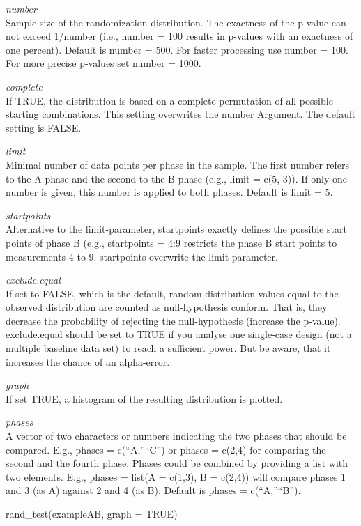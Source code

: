 \documentclass[
]{book}
\newenvironment{Shaded}{\begin{snugshade}}{\end{snugshade}}
\newcommand{\AttributeTok}[1]{\textcolor[rgb]{0.77,0.63,0.00}{#1}}
\newcommand{\ConstantTok}[1]{\textcolor[rgb]{0.00,0.00,0.00}{#1}}
\newcommand{\FunctionTok}[1]{\textcolor[rgb]{0.00,0.00,0.00}{#1}}
\newcommand{\NormalTok}[1]{#1}
\begin{document}
\emph{number}\\
Sample size of the randomization distribution. The exactness of the p-value can not exceed 1/number (i.e., number = 100 results in p-values with an exactness of one percent). Default is number = 500. For faster processing use number = 100. For more precise p-values set number = 1000.

\emph{complete}\\
If TRUE, the distribution is based on a complete permutation of all possible starting combinations. This setting overwrites the number Argument. The default setting is FALSE.

\emph{limit}\\
Minimal number of data points per phase in the sample. The first number refers to the A-phase and the second to the B-phase (e.g., limit = c(5, 3)). If only one number is given, this number is applied to both phases. Default is limit = 5.

\emph{startpoints}\\
Alternative to the limit-parameter, startpoints exactly defines the possible start points of phase B (e.g., startpoints = 4:9 restricts the phase B start points to measurements 4 to 9. startpoints overwrite the limit-parameter.

\emph{exclude.equal}\\
If set to FALSE, which is the default, random distribution values equal to the observed distribution are counted as null-hypothesis conform. That is, they decrease the probability of rejecting the null-hypothesis (increase the p-value). exclude.equal should be set to TRUE if you analyse one single-case design (not a multiple baseline data set) to reach a sufficient power. But be aware, that it increases the chance of an alpha-error.

\emph{graph}\\
If set TRUE, a histogram of the resulting distribution is plotted.

\emph{phases}\\
A vector of two characters or numbers indicating the two phases that should be compared. E.g., phases = c(``A,''``C'') or phases = c(2,4) for comparing the second and the fourth phase. Phases could be combined by providing a list with two elements. E.g., phases = list(A = c(1,3), B = c(2,4)) will compare phases 1 and 3 (as A) against 2 and 4 (as B). Default is phases = c(``A,''``B'').

\begin{Shaded}
\begin{Highlighting}[]
\FunctionTok{rand\_test}\NormalTok{(exampleAB, }\AttributeTok{graph =} \ConstantTok{TRUE}\NormalTok{)}
\end{Highlighting}
\end{Shaded}
\end{document}
